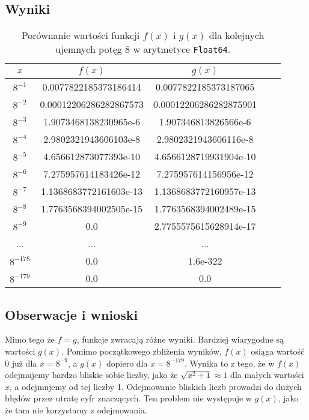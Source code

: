 \documentclass{article}
\begin{document}
\subsection{Wyniki}
\begin{table}[H]
\begin{adjustbox}{center}
\begin{tabular}{|c|c|c|c|c|}
    \hline
    $x$ & $f(x)$ & $g(x)$\\
    \hline
    $8^{-1}$ & 0.0077822185373186414 & 0.0077822185373187065\\
    \hline
    $8^{-2}$ & 0.00012206286282867573 & 0.00012206286282875901\\
    \hline
    $8^{-3}$ & 1.9073468138230965e-6 & 1.907346813826566e-6\\
    \hline
    $8^{-4}$ & 2.9802321943606103e-8 & 2.9802321943606116e-8\\
    \hline
    $8^{-5}$ & 4.656612873077393e-10 & 4.6566128719931904e-10\\
    \hline
    $8^{-6}$ & 7.275957614183426e-12 & 7.275957614156956e-12\\
    \hline
    $8^{-7}$ & 1.1368683772161603e-13 & 1.1368683772160957e-13\\
    \hline
    $8^{-8}$ & 1.7763568394002505e-15 & 1.7763568394002489e-15\\
    \hline
    $8^{-9}$ & 0.0 & 2.7755575615628914e-17\\
    \hline
    ... & ... & ...\\
    \hline
    $8^{-178}$ & 0.0 & 1.6e-322\\
    \hline
    $8^{-179}$ & 0.0 & 0.0\\
    \hline
\end{tabular}
\end{adjustbox}
\caption{Porównanie wartości funkcji $f(x)$ i $g(x)$ dla kolejnych ujemnych potęg 8 w arytmetyce \texttt{Float64}.}
\end{table}

\subsection{Obserwacje i wnioski}
Mimo tego że $f = g$, funkcje zwracają różne wyniki. Bardziej wiarygodne są wartości $g(x)$. Pomimo początkowego zbliżenia
wyników, $f(x)$ osiąga wartość 0 już dla $x = 8^{-9}$, a $g(x)$ dopiero dla $x = 8^{-179}$. Wynika to z tego, że w
$f(x)$ odejmujemy bardzo bliskie sobie liczby, jako że $\sqrt{x^2 + 1} \approx 1$ dla małych wartości $x$,
a odejmujemy od tej liczby 1. Odejmowanie bliskich liczb prowadzi do dużych błędów przez utratę cyfr znaczących. Ten
problem nie występuje w $g(x)$, jako że tam nie korzystamy z odejmowania.
\end{document}
